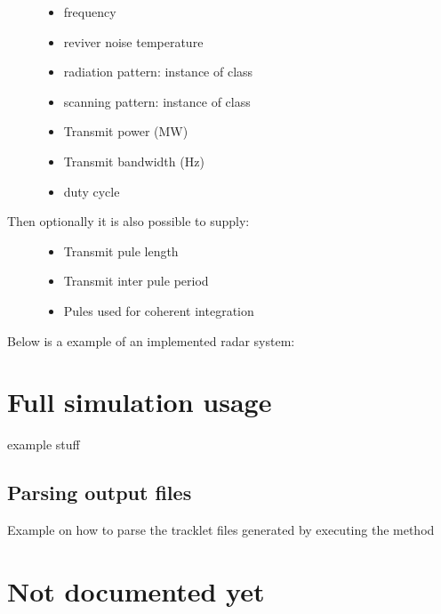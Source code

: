 \documentclass[letterpaper,10pt,english]{sphinxmanual}
\begin{document}
\begin{description}
\begin{itemize}
\item {} 
frequency

\item {} 
reviver noise temperature

\item {} 
radiation pattern: instance of  class

\item {} 
scanning pattern: instance of  class

\item {} 
Transmit power (MW)

\item {} 
Transmit bandwidth (Hz)

\item {} 
duty cycle

\end{itemize}

\item[{Then optionally it is also possible to supply:}] \leavevmode\begin{itemize}
\item {} 
Transmit pule length

\item {} 
Transmit inter pule period

\item {} 
Pules used for coherent integration

\end{itemize}

\end{description}

Below is a example of an implemented radar system:


\section{Full simulation usage}
\label{\detokenize{usage_examples:full-simulation-usage}}
example stuff


\subsection{Parsing output files}
\label{\detokenize{usage_examples:parsing-output-files}}
Example on how to parse the tracklet files generated by executing the method 


\section{Not documented yet}
\label{\detokenize{usage_examples:not-documented-yet}}
\end{document}
